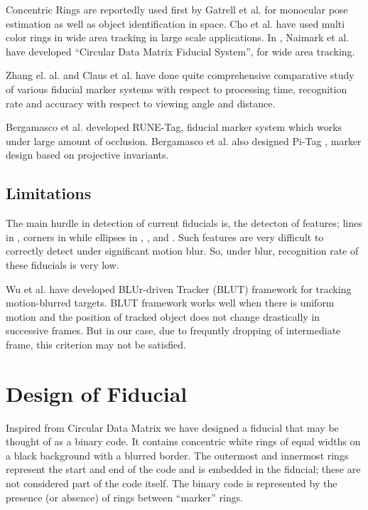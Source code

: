 \documentclass[runningheads]{llncs}
\begin{document}
Concentric Rings are reportedly used first by Gatrell et al.\cite{concentric}
for monocular pose estimation as well as object identification in space. Cho et al.
\cite{Cho:2001}\cite{Cho97fastcolor} have used multi color rings in wide area
tracking in large scale applications. In \cite{NaimarkF02}, Naimark et al.
have developed ``Circular Data Matrix Fiducial System'', for wide area tracking.

Zhang el. al.\cite{Zhang:2002} and Claus et al. \cite{ClausF04} have done
quite comprehensive comparative study of various fiducial marker systems with
respect to processing time, recognition rate and accuracy with
respect to viewing angle and distance.

Bergamasco et al. \cite{runetag11} developed RUNE-Tag, fiducial marker
system which works under large amount of occlusion. Bergamasco et al. also 
designed Pi-Tag \cite{Pitag13}, marker design based on projective
invariants.

\subsection{Limitations}
The main hurdle in detection of current fiducials is, the detecton of features;
lines in \cite{ARToolkit02}, corners in \cite{Fiala05} while ellipses in
\cite{Cho:2001}, \cite{Cho97fastcolor}, \cite{runetag11} and \cite{Pitag13}.
Such features are very difficult to correctly detect under significant motion
blur. So, under blur, recognition rate of these fiducials is very low. 

Wu et al.\cite{Wu:2011} have developed BLUr-driven Tracker (BLUT) framework for
tracking motion-blurred targets. BLUT framework works well when there is
uniform motion and the position of tracked object does not change drastically in
successive frames. But in our case, due to frequntly dropping of intermediate
frame, this criterion may not be satisfied. 
 
\section{Design of Fiducial}
Inspired from Circular Data Matrix\cite{NaimarkF02} we have designed a fiducial
that may be thought of as a binary code.  It contains concentric white rings of
equal widths on a black background with a blurred border. The outermost and
innermost rings represent the start and end of the code and is embedded in the
fiducial; these are not considered part of the code itself. The binary code is
represented by the presence (or absence) of rings between ``marker'' rings.
\end{document}
